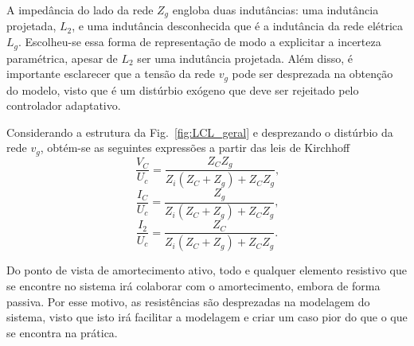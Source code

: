   A impedância do lado da rede $Z_g$ engloba duas indutâncias: uma indutância projetada, $L_2$, e uma indutância desconhecida que é a indutância da rede elétrica $L_g$. Escolheu-se essa forma de representação de modo a explicitar a incerteza paramétrica, apesar de $L_2$ ser uma indutância projetada. Além disso, é importante esclarecer que a tensão da rede $v_g$ pode ser desprezada na obtenção do modelo, visto que é um distúrbio exógeno que deve ser rejeitado pelo controlador adaptativo.




  Considerando a estrutura da Fig.~\ref{fig:LCL_geral} e desprezando o distúrbio da rede $v_g$, obtém-se as seguintes expressões a partir das leis de Kirchhoff
  \begin{equation}
    \frac{V_C}{U_c} = \frac{Z_C Z_g}{Z_i \left( Z_C + Z_g \right) + Z_C Z_g}
    \text{,}
    \label{eq:vc_uc}
  \end{equation}
  \begin{equation}
    \frac{I_C}{U_c} = \frac{Z_g}{Z_i \left( Z_C + Z_g \right) + Z_C Z_g}
    \text{,}
    \label{eq:ic_uc}
  \end{equation}
  \begin{equation}
    \frac{I_2}{U_c} = \frac{Z_C}{Z_i \left( Z_C + Z_g \right) + Z_C Z_g}
    \text{.}
  \end{equation}

  Do ponto de vista de amortecimento ativo, todo e qualquer elemento resistivo que se encontre no sistema irá colaborar com o amortecimento, embora de forma passiva. Por esse motivo, as resistências são desprezadas na modelagem do sistema, visto que isto irá facilitar a modelagem e criar um caso pior do que o que se encontra na prática.

